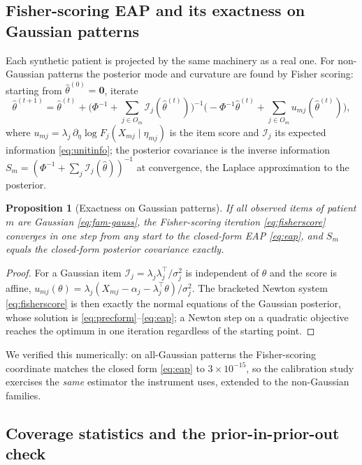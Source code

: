 \documentclass[11pt]{article}
\newcommand{\info}{\mathcal{I}}
\theoremstyle{plain}
\newtheorem{proposition}{Proposition}
\theoremstyle{definition}
\begin{document}
\subsection{Fisher-scoring EAP and its exactness on Gaussian patterns}
\label{sub:fisher-eap}

Each synthetic patient is projected by the same machinery as a real one. For non-Gaussian
patterns the posterior mode and curvature are found by Fisher scoring: starting from
$\hat\theta^{(0)}=\mathbf 0$, iterate
\begin{equation}
  \hat\theta^{(t+1)}=\hat\theta^{(t)}
  +\Big(\Phi^{-1}+\textstyle\sum_{j\in O_m}\info_j(\hat\theta^{(t)})\Big)^{-1}
  \Big(\!-\Phi^{-1}\hat\theta^{(t)}+\textstyle\sum_{j\in O_m} u_{mj}(\hat\theta^{(t)})\Big),
  \label{eq:fisherscore}
\end{equation}
where $u_{mj}=\lambda_j\,\partial_\eta\log F_j(X_{mj}\mid\eta_{mj})$ is the item score and
$\info_j$ its expected information \eqref{eq:unitinfo}; the posterior covariance is the inverse
information $S_m=(\Phi^{-1}+\sum_{j}\info_j(\hat\theta))^{-1}$ at convergence, the Laplace
approximation to the posterior.

\begin{proposition}[Exactness on Gaussian patterns]\label{prop:exact}
If all observed items of patient $m$ are Gaussian \eqref{eq:fam-gauss}, the Fisher-scoring
iteration \eqref{eq:fisherscore} converges in one step from any start to the closed-form EAP
\eqref{eq:eap}, and $S_m$ equals the closed-form posterior covariance exactly.
\end{proposition}
\begin{proof}
For a Gaussian item $\info_j=\lambda_j\lambda_j^\top/\sigma_j^2$ is independent of $\theta$
and the score is affine, $u_{mj}(\theta)=\lambda_j(X_{mj}-\alpha_j-\lambda_j^\top\theta)/\sigma_j^2$.
The bracketed Newton system \eqref{eq:fisherscore} is then exactly the normal equations of the
Gaussian posterior, whose solution is \eqref{eq:precform}--\eqref{eq:eap}; a Newton step on a
quadratic objective reaches the optimum in one iteration regardless of the starting point.
\end{proof}
\noindent
We verified this numerically: on all-Gaussian patterns the Fisher-scoring coordinate matches
the closed form \eqref{eq:eap} to $3\times10^{-15}$, so the calibration study exercises the
\emph{same} estimator the instrument uses, extended to the non-Gaussian families.

\subsection{Coverage statistics and the prior-in-prior-out check}
\label{sub:coverage}
\end{document}
